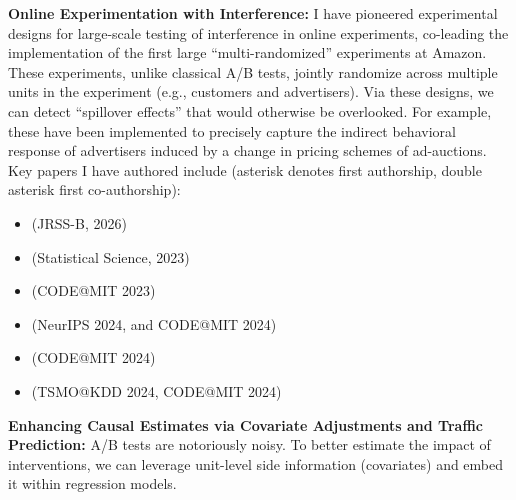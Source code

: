 \begin{itemize}
    \item \textbf{Online Experimentation with Interference:} 
    I have pioneered experimental designs for large-scale testing of interference in online experiments, co-leading the implementation of the first large ``multi-randomized'' experiments at Amazon. These experiments, unlike classical A/B tests, jointly randomize across multiple units in the experiment (e.g., customers and advertisers). Via these designs, we can detect ``spillover effects'' that would otherwise be overlooked. For example, these have been implemented to precisely capture the indirect behavioral response of advertisers induced by a change in pricing schemes of ad-auctions. Key papers I have authored include (asterisk denotes first authorship, double asterisk first co-authorship): 
    \small{
        \begin{itemize}
	    \item \href{https://doi.org/10.1093/jrsssb/qkaf073}{\color{blue}{Multiple Randomization Designs*}} (JRSS-B, 2026)
            \item {\href{https://projecteuclid.org/journals/statistical-science/advance-publication/Experimental-Design-in-Marketplaces/10.1214/23-STS883.short}{\color{blue}{Experimental Design in Marketplaces*}}} (Statistical Science, 2023)
            \item \href{https://www.amazon.science/publications/efficient-switchback-experiments-via-multiple-randomization-designs}{\color{blue}{Efficient Switchback Experiments via Multiple Randomization Designs*}} (CODE@MIT 2023)
            \item \href{https://arxiv.org/abs/2405.18621}{\color{blue}{Multi-Armed Bandits with Network Interference}} (NeurIPS 2024, and CODE@MIT 2024)
            \item \href{}{\color{blue}{Regression Adjustments for Experimental Designs in Two-Side Marketplaces}} (CODE@MIT 2024)
            \item \href{}{\color{blue}{Measuring direct and Indirect Impacts in a Multi-Sided Marketplace: Evidence from a Clustered Multiple Randomization Experiment**}} (TSMO@KDD 2024, CODE@MIT 2024)
        \end{itemize}
	}
	\normalsize{    
    \item \textbf{Enhancing Causal Estimates via Covariate Adjustments and Traffic Prediction:}
    A/B tests are notoriously noisy. To better estimate the impact of interventions, we can leverage unit-level side information (covariates) and embed it within regression models. 
}
\end{itemize}
